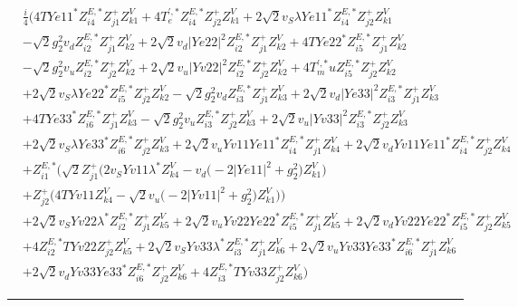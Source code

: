 \begin{align} 
 &\frac{i}{4} \Big(4 TYe11^* Z^{E,*}_{i 4} Z_{{j 1}}^{+} Z_{{k 1}}^{V} +4 T^{{\prime},*}_e Z^{E,*}_{i 4} Z_{{j 2}}^{+} Z_{{k 1}}^{V} +2 \sqrt{2} v_S \lambda Ye11^* Z^{E,*}_{i 4} Z_{{j 2}}^{+} Z_{{k 1}}^{V} \nonumber \\ 
 &- \sqrt{2} g_{2}^{2} v_d Z^{E,*}_{i 2} Z_{{j 1}}^{+} Z_{{k 2}}^{V} +2 \sqrt{2} v_d |Ye22|^2 Z^{E,*}_{i 2} Z_{{j 1}}^{+} Z_{{k 2}}^{V} +4 TYe22^* Z^{E,*}_{i 5} Z_{{j 1}}^{+} Z_{{k 2}}^{V} \nonumber \\ 
 &- \sqrt{2} g_{2}^{2} v_u Z^{E,*}_{i 2} Z_{{j 2}}^{+} Z_{{k 2}}^{V} +2 \sqrt{2} v_u |Yv22|^2 Z^{E,*}_{i 2} Z_{{j 2}}^{+} Z_{{k 2}}^{V} +4 T^{{\prime},*}_mu Z^{E,*}_{i 5} Z_{{j 2}}^{+} Z_{{k 2}}^{V} \nonumber \\ 
 &+2 \sqrt{2} v_S \lambda Ye22^* Z^{E,*}_{i 5} Z_{{j 2}}^{+} Z_{{k 2}}^{V} - \sqrt{2} g_{2}^{2} v_d Z^{E,*}_{i 3} Z_{{j 1}}^{+} Z_{{k 3}}^{V} +2 \sqrt{2} v_d |Ye33|^2 Z^{E,*}_{i 3} Z_{{j 1}}^{+} Z_{{k 3}}^{V} \nonumber \\ 
 &+4 TYe33^* Z^{E,*}_{i 6} Z_{{j 1}}^{+} Z_{{k 3}}^{V} - \sqrt{2} g_{2}^{2} v_u Z^{E,*}_{i 3} Z_{{j 2}}^{+} Z_{{k 3}}^{V} +2 \sqrt{2} v_u |Yv33|^2 Z^{E,*}_{i 3} Z_{{j 2}}^{+} Z_{{k 3}}^{V} \nonumber \\ 
 &+2 \sqrt{2} v_S \lambda Ye33^* Z^{E,*}_{i 6} Z_{{j 2}}^{+} Z_{{k 3}}^{V} +2 \sqrt{2} v_u Yv11 Ye11^* Z^{E,*}_{i 4} Z_{{j 1}}^{+} Z_{{k 4}}^{V} +2 \sqrt{2} v_d Yv11 Ye11^* Z^{E,*}_{i 4} Z_{{j 2}}^{+} Z_{{k 4}}^{V} \nonumber \\ 
 &+Z^{E,*}_{i 1} \Big(\sqrt{2} Z_{{j 1}}^{+} \Big(2 v_S Yv11 \lambda^* Z_{{k 4}}^{V}  - v_d \Big(-2 |Ye11|^2  + g_{2}^{2}\Big)Z_{{k 1}}^{V} \Big)\nonumber \\ 
 &+Z_{{j 2}}^{+} \Big(4 TYv11 Z_{{k 4}}^{V}  - \sqrt{2} v_u \Big(-2 |Yv11|^2  + g_{2}^{2}\Big)Z_{{k 1}}^{V} \Big)\Big)\nonumber \\ 
 &+2 \sqrt{2} v_S Yv22 \lambda^* Z^{E,*}_{i 2} Z_{{j 1}}^{+} Z_{{k 5}}^{V} +2 \sqrt{2} v_u Yv22 Ye22^* Z^{E,*}_{i 5} Z_{{j 1}}^{+} Z_{{k 5}}^{V} +2 \sqrt{2} v_d Yv22 Ye22^* Z^{E,*}_{i 5} Z_{{j 2}}^{+} Z_{{k 5}}^{V} \nonumber \\ 
 &+4 Z^{E,*}_{i 2} TYv22 Z_{{j 2}}^{+} Z_{{k 5}}^{V} +2 \sqrt{2} v_S Yv33 \lambda^* Z^{E,*}_{i 3} Z_{{j 1}}^{+} Z_{{k 6}}^{V} +2 \sqrt{2} v_u Yv33 Ye33^* Z^{E,*}_{i 6} Z_{{j 1}}^{+} Z_{{k 6}}^{V} \nonumber \\ 
 &+2 \sqrt{2} v_d Yv33 Ye33^* Z^{E,*}_{i 6} Z_{{j 2}}^{+} Z_{{k 6}}^{V} +4 Z^{E,*}_{i 3} TYv33 Z_{{j 2}}^{+} Z_{{k 6}}^{V} \Big)\end{align} 
\hrule 
